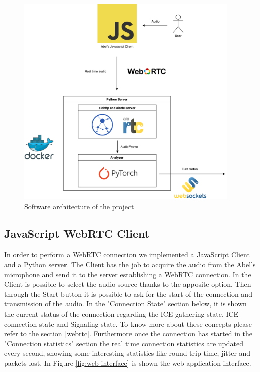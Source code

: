 \documentclass[../main.tex]{subfiles}
\begin{document}
\begin{figure}[ht]
    \centering
    \includegraphics[width=0.95\textwidth]{images/Software architecture.png}
    \caption{Software architecture of the project}
    \label{fig:software architecture}
\end{figure}

\subsection{JavaScript WebRTC Client}

In order to perform a WebRTC connection we implemented a JavaScript Client and a Python server. The Client has the job to acquire the audio from the Abel's microphone and send it to the server establishing a WebRTC connection. In the Client is possible to select the audio source thanks to the apposite option. Then through the Start button it is possible to ask for the start of the connection and transmission of the audio. In the "Connection State" section below, it is shown the current status of the connection regarding the ICE gathering state, ICE connection state and Signaling state. To know more about these concepts please refer to the section \ref{webrtc}. Furthermore once the connection has started in the "Connection statistics" section the real time connection statistics are updated every second, showing some interesting statistics like round trip time, jitter and packets lost. In Figure \ref{fig:web interface} is shown the web application interface.
\end{document}
